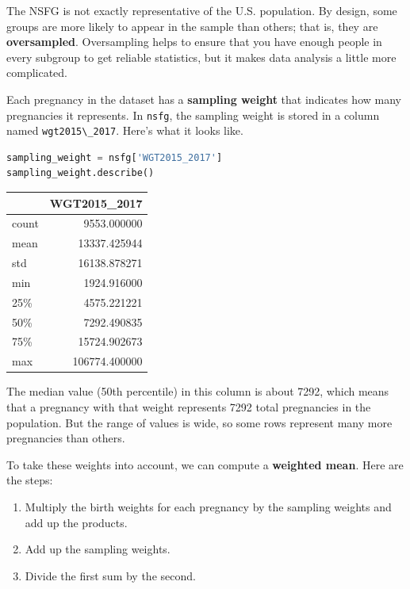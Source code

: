 The NSFG is not exactly representative of the U.S. population. By
design, some groups are more likely to appear in the sample than others;
that is, they are \textbf{oversampled}. Oversampling helps to ensure
that you have enough people in every subgroup to get reliable
statistics, but it makes data analysis a little more complicated.

Each pregnancy in the dataset has a \textbf{sampling weight} that
indicates how many pregnancies it represents. In
\passthrough{\lstinline!nsfg!}, the sampling weight is stored in a
column named \passthrough{\lstinline!wgt2015\_2017!}. Here's what it
looks like.

\begin{lstlisting}[language=Python]
sampling_weight = nsfg['WGT2015_2017']
sampling_weight.describe()
\end{lstlisting}

\begin{tabular}{lr}
\toprule
{} &   WGT2015\_2017 \\
\midrule
count &    9553.000000 \\
mean  &   13337.425944 \\
std   &   16138.878271 \\
min   &    1924.916000 \\
25\%   &    4575.221221 \\
50\%   &    7292.490835 \\
75\%   &   15724.902673 \\
max   &  106774.400000 \\
\bottomrule
\end{tabular}

The median value (50th percentile) in this column is about 7292, which
means that a pregnancy with that weight represents 7292 total
pregnancies in the population. But the range of values is wide, so some
rows represent many more pregnancies than others.

To take these weights into account, we can compute a \textbf{weighted
mean}. Here are the steps:

\begin{enumerate}
\def\labelenumi{\arabic{enumi}.}
\item
  Multiply the birth weights for each pregnancy by the sampling weights
  and add up the products.
\item
  Add up the sampling weights.
\item
  Divide the first sum by the second.
\end{enumerate}

